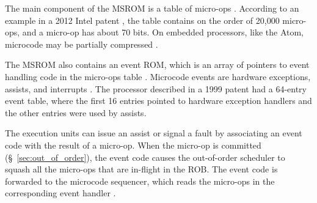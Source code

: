 The main component of the MSROM is a table of micro-ops \cite{intel2008genetic,
intel2012clusters}. According to an example in a 2012 Intel patent
\cite{intel2012clusters}, the table contains on the order of 20,000 micro-ops,
and a micro-op has about 70 bits. On embedded processors, like the Atom,
microcode may be partially compressed
\cite{intel2008genetic, intel2012clusters}.


The MSROM also contains an event ROM, which is an array of pointers to event
handling code in the micro-ops table \cite{intel1999events}. Microcode events
are hardware exceptions, assists, and interrupts \cite{intel1997events,
intel1999exceptions, intel2007microstack}. The processor described in a 1999
patent \cite{intel1999events} had a 64-entry event table, where the first 16
entries pointed to hardware exception handlers and the other entries were used
by assists.


The execution units can issue an assist or signal a fault by associating an
event code with the result of a micro-op. When the micro-op is committed
(\S~\ref{sec:out_of_order}), the event code causes the out-of-order scheduler
to squash all the micro-ops that are in-flight in the ROB. The event code is
forwarded to the microcode sequencer, which reads the micro-ops in the
corresponding event handler \cite{intel1997events, intel1999exceptions}.

